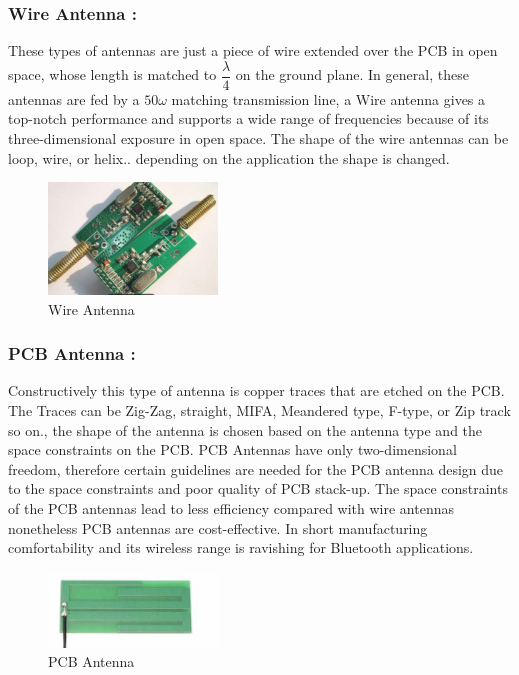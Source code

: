 \subsubsection{Wire Antenna :}
These types of antennas are just a piece of wire extended over the PCB in open space, whose length is matched to $\dfrac{\lambda}{4}$ on the ground plane.
In general, these antennas are fed by a $50\omega$ matching transmission line, a Wire antenna gives a top-notch performance and supports a wide range of frequencies because of its three-dimensional exposure in open space.
The shape of the wire antennas can be loop, wire, or helix.. depending on the application the shape is changed.

\begin{figure}[h]
	\centering
	\includegraphics[width=0.4\textwidth]{Chap03/Figures/Wire_antenna.PNG}
	\caption{Wire Antenna}
	\label{WIRE_ANTENNA}
\end{figure}


\subsubsection{ PCB Antenna :}Constructively this type of antenna is copper traces
that are etched on the PCB. The Traces can be Zig-Zag, straight, MIFA, Meandered type, F-type, or Zip track so on.,
the shape of the antenna is chosen based on the antenna type and the space constraints on the PCB. PCB Antennas have only two-dimensional freedom, therefore certain guidelines are needed for the PCB antenna design due to the space constraints and poor quality of PCB stack-up.
The space constraints of the PCB antennas lead to less efficiency compared with wire antennas nonetheless PCB antennas are cost-effective.
In short manufacturing comfortability and its wireless range is ravishing for Bluetooth applications.

\begin{figure}[h]
	\centering
	\includegraphics[width=0.4\textwidth]{Chap03/Figures/PCB_Antenna.PNG}
	\caption{PCB Antenna}
	\label{PCB_ANTENNA}
\end{figure}


